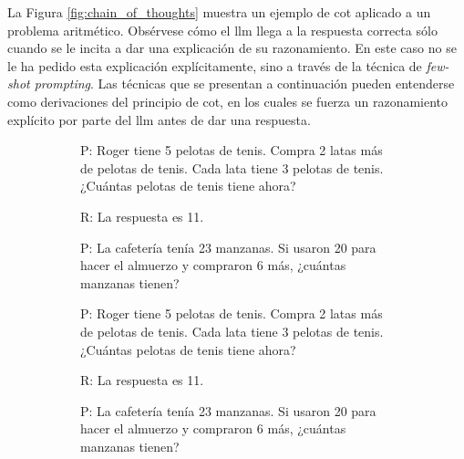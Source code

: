 La Figura \ref{fig:chain_of_thoughts} muestra un ejemplo de \gls{cot} aplicado a un problema aritmético. Obsérvese cómo el \gls{llm} llega a la respuesta correcta sólo cuando se le incita a dar una explicación de su razonamiento. En este caso no se le ha pedido esta explicación explícitamente, sino a través de la técnica de \emph{few-shot prompting}. Las técnicas que se presentan a continuación pueden entenderse como derivaciones del principio de \gls{cot}, en los cuales se fuerza un razonamiento explícito por parte del \gls{llm} antes de dar una respuesta.

\begin{figure}[H]
    \caption[Chain of thoughts]{\emph{Chain of thoughts}.}
    \centering
    \begin{subfigure}{.48\textwidth}
      \centering
      \begin{mdframed}
        \fontsize{9.5pt}{11pt}\selectfont
        P: Roger tiene 5 pelotas de tenis. Compra 2 latas más de pelotas de tenis. Cada lata tiene 3 pelotas de tenis. ¿Cuántas pelotas de tenis tiene ahora?
        \vspace{0.2cm}

        R: La respuesta es 11.
        \vspace{0.2cm}

        P: La cafetería tenía 23 manzanas. Si usaron 20 para hacer el almuerzo y compraron 6 más, ¿cuántas manzanas tienen?
        \vspace{0.2cm}
      \end{mdframed}
    \end{subfigure}\hfill
    \begin{subfigure}{.48\textwidth}
      \centering
      \begin{mdframed}
        \fontsize{9.5pt}{11pt}\selectfont
        P: Roger tiene 5 pelotas de tenis. Compra 2 latas más de pelotas de tenis. Cada lata tiene 3 pelotas de tenis. ¿Cuántas pelotas de tenis tiene ahora?
        \vspace{0.2cm}

        R:  La respuesta es 11.
        \vspace{0.2cm}

        P: La cafetería tenía 23 manzanas. Si usaron 20 para hacer el almuerzo y compraron 6 más, ¿cuántas manzanas tienen?
        \vspace{0.2cm}
      \end{mdframed}
    \end{subfigure}


\end{figure}
